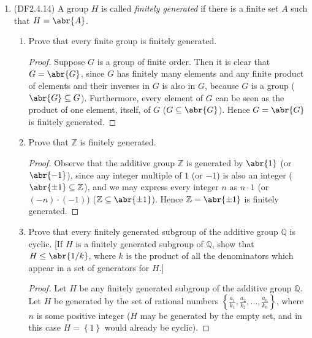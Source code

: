 \documentclass[11pt]{article}
\newcommand{\cbr}[1]{\left\{#1\right\}}
\DeclareMathOperator\Aut{Aut}
\begin{document}
\begin{enumerate}
\begin{enumerate}[label=(\alph*)]
\begin{proof}
        Furthermore, the mapping is surjective because every automorphism $\sigma$ of $Z_n$ is equal to $\sigma_a$ for some integer $a$, so we can combine this with $\sigma_a = \sigma_b$ if and only if $a\equiv b \pmod{n}$, where $b$ can be chosen to be the remainder of dividing $a$ by $n$. Since $\overline{b}$ is a residue class of $(\mathbb{Z}/n\mathbb{Z})^{\times}$, we have that the preimage of $\sigma$ under this mapping is $\overline{b}$, so all automorphisms of $Z_n$ have a preimage in $(\mathbb{Z}/n\mathbb{Z})^{\times}$ under this mapping.

        Hence the mapping $\overline{a}\mapsto \sigma_a$ is an isomorphism from $(\mathbb{Z}/n\mathbb{Z})^{\times}$ onto $\Aut(Z_n)$, so the order of these groups are equal ($\abs{(\mathbb{Z}/n\mathbb{Z})^{\times}} = \abs{\Aut(Z_n)} = \varphi(n)$), and both groups are cyclic. Hence $\Aut(Z_n)$ is an abelian group of order $\varphi(n)$.
      \end{proof}
    \end{enumerate}
    \item (DF2.4.14) A group $H$ is called \textit{finitely generated} if there is a finite set $A$ such that $H=\abr{A}$. \begin{enumerate}[label=(\alph*)]
      \item Prove that every finite group is finitely generated. \begin{proof}
        Suppose $G$ is a group of finite order. Then it is clear that $G = \abr{G}$, since $G$ has finitely many elements and any finite product of elements and their inverses in $G$ is also in $G$, because $G$ is a group ($\abr{G}\subseteq G$). Furthermore, every element of $G$ can be seen as the product of one element, itself, of $G$ ($G \subseteq \abr{G}$). Hence $G = \abr{G}$ is finitely generated. 
      \end{proof}
      \item Prove that $\mathbb{Z}$ is finitely generated. \begin{proof}
        Observe that the additive group $\mathbb{Z}$ is generated by $\abr{1}$ (or $\abr{-1}$), since any integer multiple of $1$ (or $-1$) is also an integer ($\abr{\pm 1}\subseteq \mathbb{Z}$), and we may express every integer $n$ as $n\cdot 1$ (or $(-n) \cdot (-1)$) ($\mathbb{Z}\subseteq \abr{\pm 1}$). Hence $\mathbb{Z} = \abr{\pm 1}$ is finitely generated.
      \end{proof}
      \item Prove that every finitely generated subgroup of the additive group $\mathbb{Q}$ is cyclic. [If $H$ is a finitely generated subgroup of $\mathbb{Q}$, show that $H\leq \abr{1/k}$, where $k$ is the product of all the denominators which appear in a set of generators for $H$.] \begin{proof}
        Let $H$ be any finitely generated subgroup of the additive group $\mathbb{Q}$. Let $H$ be generated by the set of rational numbers $\cbr{\frac{a_1}{k_1},\frac{a_2}{k_2}, \dots, \frac{a_n}{k_n}}$, where $n$ is some positive integer ($H$ may be generated by the empty set, and in this case $H = \cbr{1}$ would already be cyclic).


\end{proof}
\end{enumerate}
\end{enumerate}
\end{document}
